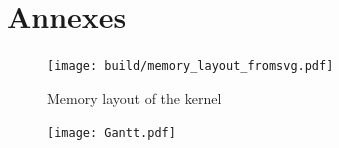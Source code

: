 \documentclass[openany, a4paper]{book}
\begin{document}
  \chapter{Annexes}
    \begin{figure}
      \centering
      \texttt{[image: build/memory\_layout\_fromsvg.pdf]}
      \caption{Memory layout of the kernel}\label{fig:memory}
    \end{figure}

    \thispagestyle{empty}
    \begin{figure}
      \centering
      \texttt{[image: Gantt.pdf]}
      \label{fig:gantt}
    \end{figure}
    \clearpage
    \restoregeometry
\end{document}
